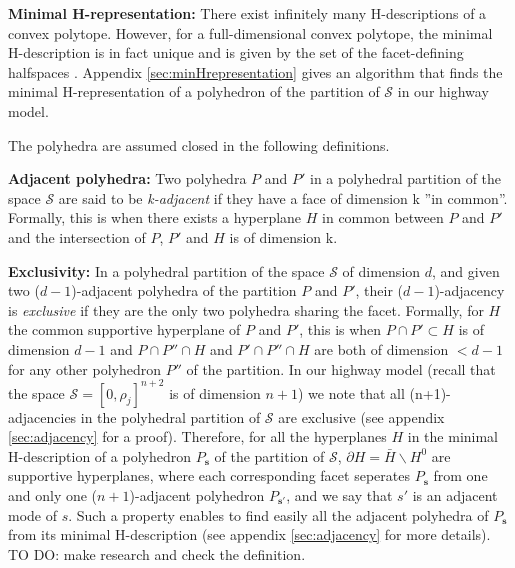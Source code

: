 \hspace{10mm}

\noindent \textbf{Minimal H-representation: }There exist infinitely many H-descriptions of a convex polytope. However, for a full-dimensional convex polytope, the minimal H-description is in fact unique and is given by the set of the facet-defining halfspaces \cite{Gruenbaum2003}. Appendix \ref{sec:minHrepresentation} gives an algorithm that finds the minimal H-representation of a polyhedron of the partition of $\mathcal{S}$ in our highway model.

\hspace{10mm}

\noindent The polyhedra are assumed closed in the following definitions.

\hspace{10mm}

\noindent \textbf{Adjacent polyhedra: } Two polyhedra $P$ and $P'$ in a polyhedral partition of the space $\mathcal{S}$ are said to be \textit{k-adjacent} if they have a face of dimension k ''in common''. Formally, this is when there exists a hyperplane $H$ in common between $P$ and $P'$ and the intersection of $P$, $P'$ and $H$ is of dimension k. 

\hspace{10mm}

\noindent \textbf{Exclusivity: } In a polyhedral partition of the space $\mathcal{S}$ of dimension $d$, and given two ($d-1$)-adjacent polyhedra of the partition $P$ and $P'$, their ($d-1$)-adjacency is \textit{exclusive} if they are the only two polyhedra sharing the facet. Formally, for $H$ the common supportive hyperplane of $P$ and $P'$, this is when $P\cap P'\subset H$ is of dimension $d-1$ and $P\cap P''\cap H$ and $P'\cap P''\cap H$ are both of dimension $<d-1$ for any other polyhedron $P''$ of the partition. In our highway model (recall that the space $\mathcal{S} = [0,\rho_{j}]^{n+2}$ is of dimension $n+1$) we note that all (n+1)-adjacencies in the polyhedral partition of $\mathcal{S}$ are exclusive (see appendix \ref{sec:adjacency} for a proof). Therefore, for all the hyperplanes $H$ in the minimal H-description of a polyhedron $P_{\boldsymbol s}$ of the partition of $\mathcal{S}$, $\partial H=\bar{H}\backslash H^{0}$ are supportive hyperplanes, where each corresponding facet seperates $P_{\boldsymbol s}$ from one and only one ($n+1$)-adjacent polyhedron $P_{\boldsymbol s'}$, and we say that $s'$ is an adjacent mode of $s$. Such a property enables to find easily all the adjacent polyhedra of $P_{\boldsymbol s}$ from its minimal H-description (see appendix \ref{sec:adjacency} for more details). TO DO: make research and check the definition.


